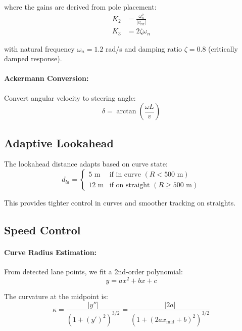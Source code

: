 \documentclass[11pt,a4paper]{article}
\begin{document}
where the gains are derived from pole placement:
\begin{align}
K_2 &= \frac{\omega_n^2}{|v_{\text{ref}}|} \\
K_3 &= 2 \zeta \omega_n
\end{align}

with natural frequency $\omega_n = 1.2$ rad/s and damping ratio $\zeta = 0.8$ (critically damped response).

\paragraph{Ackermann Conversion:}
Convert angular velocity to steering angle:
\begin{equation}
\delta = \arctan\left(\frac{\omega L}{v}\right)
\end{equation}

\subsection{Adaptive Lookahead}

The lookahead distance adapts based on curve state:
\begin{equation}
d_{la} = \begin{cases}
5 \text{ m} & \text{if in curve } (R < 500\text{ m}) \\
12 \text{ m} & \text{if on straight } (R \geq 500\text{ m})
\end{cases}
\end{equation}

This provides tighter control in curves and smoother tracking on straights.

\subsection{Speed Control}

\paragraph{Curve Radius Estimation:}
From detected lane points, we fit a 2nd-order polynomial:
\begin{equation}
y = ax^2 + bx + c
\end{equation}

The curvature at the midpoint is:
\begin{equation}
\kappa = \frac{|y''|}{(1 + (y')^2)^{3/2}} = \frac{|2a|}{(1 + (2ax_{\text{mid}} + b)^2)^{3/2}}
\end{equation}
\end{document}

